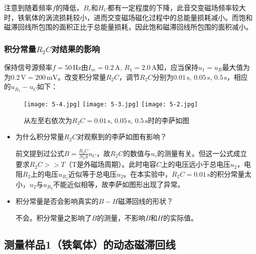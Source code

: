 \documentclass[12pt]{article}
\begin{document}
注意到随着频率$f$的降低，$B_r$和$H_C$都有一定程度的下降，此音交变磁场频率较大时，铁氧体的涡流损耗较小，进而交变磁场磁化过程中的总能量损耗减小。而饱和磁滞回线所包围的面积正比于总能量损耗，因此饱和磁滞回线所包围的面积减小。

\subsubsection{积分常量$R_2C$对结果的影响}

保持信号源频率$f=50\,\mathrm{Hz}$由$I_m=0.2\,\mathrm{A},\,R_1=2.0\,\mathrm{A}$知，应当保持$u_1=u_R$最大值为为$0.2\,\mathrm{V} = 200\,\mathrm{mV}$。改变积分常量$R_2C$，调节$R_2C$分别为$0.01\,\mathrm{s},\,0.05\,\mathrm{s},\,0.5\,\mathrm{s}$，相应的$u_{R_1}-u_C$如下：

\begin{figure}[htbp]
    \centering
    \texttt{[image: 5-4.jpg]}
    \quad
    \texttt{[image: 5-3.jpg]}
    \quad
    \texttt{[image: 5-2.jpg]}
    \caption{从左至右依次为$R_2C=0.01\,\mathrm{s},\,0.05\,\mathrm{s},\,0.5\,\mathrm{s}$时的李萨如图}
\end{figure}

\begin{itemize}
    \item 为什么积分常量$R_2C$对观察到的李萨如图有影响？
    
    前文提到过公式$B=\frac{R_2C}{N_2S}u_C$，故$R_2C$的数值与$u_c$的测量有关。但这一公式成立要求$R_2C>>T$（T是外磁场周期）。此时电容$C$上的电压远小于总电压$u_2$，电阻$R_2$上的电压$u_{R_{2}}$近似等于总电压$u_2$。在本实验中，$R_2C=0.01\,\mathrm{s}$的积分常量太小，$u_2$与$u_{R_2}$不能近似相等，故李萨如图形出现了异常。

    \item 积分常量是否会影响真实的$B-H$磁滞回线的形状？
    
    不会。积分常量之影响了$B$的测量，不影响$B$和$H$的实际值。
\end{itemize}

\subsection{测量样品1（铁氧体）的动态磁滞回线}
\end{document}
